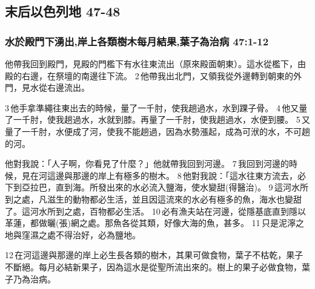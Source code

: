\subsection{末后以色列地 47-48}
\subsubsection{水於殿門下湧出,岸上各類樹木每月結果,葉子為治病 47:1-12}
他帶我回到殿門，見殿的門檻下有水往東流出（原來殿面朝東）。這水從檻下，由殿的右邊，在祭壇的南邊往下流。 2 他帶我出北門，又領我從外邊轉到朝東的外門，見水從右邊流出。

3 他手拿準繩往東出去的時候，量了一千肘，使我趟過水，水到踝子骨。 4 他又量了一千肘，使我趟過水，水就到膝。再量了一千肘，使我趟過水，水便到腰。 5 又量了一千肘，水便成了河，使我不能趟過，因為水勢漲起，成為可洑的水，不可趟的河。

他對我說：「人子啊，你看見了什麼？」他就帶我回到河邊。 7 我回到河邊的時候，見在河這邊與那邊的岸上有極多的樹木。 8 他對我說：「這水往東方流去，必下到亞拉巴，直到海。所發出來的水必流入鹽海，使水變甜(得醫治)。 9 這河水所到之處，凡滋生的動物都必生活，並且因這流來的水必有極多的魚，海水也變甜了。這河水所到之處，百物都必生活。 10 必有漁夫站在河邊，從隱基底直到隱以革蓮，都做曬(張)網之處。那魚各從其類，好像大海的魚，甚多。 11 只是泥濘之地與窪濕之處不得治好，必為鹽地。 

12 在河這邊與那邊的岸上必生長各類的樹木，其果可做食物，葉子不枯乾，果子不斷絕。每月必結新果子，因為這水是從聖所流出來的。樹上的果子必做食物，葉子乃為治病。




